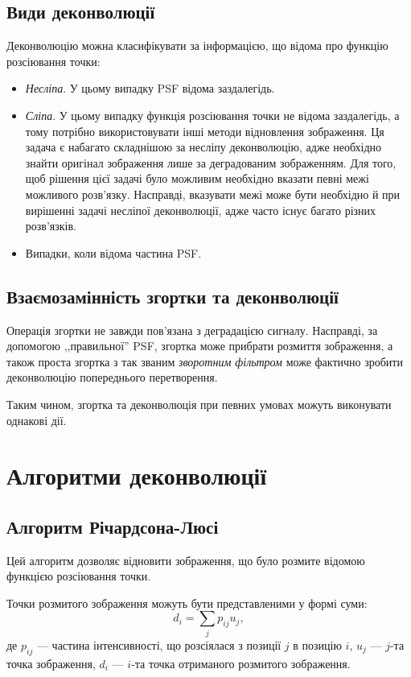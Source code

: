 \documentclass[simple,14pt,utf8,ukrainian]{eskdtext}
\begin{document}
  \subsection{Види деконволюції}
    Деконволюцію можна класифікувати за інформацією, що відома про функцію
    розсіювання точки:
    \begin{itemize}
      \item \emph{Несліпа}.
        У цьому випадку PSF відома заздалегідь.
      \item \emph{Сліпа}.
        У цьому випадку функція розсіювання точки не відома заздалегідь, а
        тому потрібно використовувати інші методи відновлення зображення.
        Ця задача є набагато складнішою за несліпу деконволюцію, адже
        необхідно знайти оригінал зображення лише за деградованим зображенням.
        Для того, щоб рішення цієї задачі було можливим необхідно вказати
        певні межі можливого розв’язку.
        Насправді, вказувати межі може бути необхідно й при вирішенні задачі
        несліпої деконволюції, адже часто існує багато різних розв’язків.
      \item Випадки, коли відома частина PSF.
    \end{itemize}
    \clearpage

  \subsection{Взаємозамінність згортки та деконволюції}
    Операція згортки не завжди пов’язана з деградацією сигналу.
    Насправді, за допомогою ,,правильної'' PSF, згортка може прибрати розмиття
    зображення, а також проста згортка з так званим \emph{зворотним фільтром}
    може фактично зробити деконволюцію попереднього перетворення.

    Таким чином, згортка та деконволюція при певних умовах можуть виконувати
    однакові дії.
  \clearpage
\section{Алгоритми деконволюції}
\subsection{Алгоритм Річардсона-Люсі}
  Цей алгоритм дозволяє відновити зображення, що було розмите відомою
  функцією розсіювання точки.

  Точки розмитого зображення можуть бути представленими у формі суми:
  \[ d_i = \sum_j p_{ij} u_j, \]
  де $p_{ij}$ --- частина інтенсивності, що розсіялася з позиції $j$ в
  позицію $i$, $u_j$ --- $j$-та точка зображення, $d_i$ --- $i$-та точка
  отриманого розмитого зображення.\cite{richardson-hadley}
\end{document}
